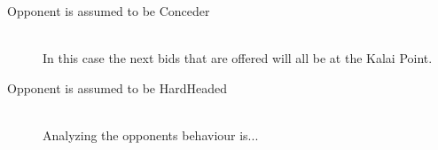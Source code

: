 \begin{description}
  \item[Opponent is assumed to be Conceder] \hfill \\
  In this case the next bids that are offered will all be at the Kalai Point.

  \item[Opponent is assumed to be HardHeaded] \hfill \\
  Analyzing the opponents behaviour is...
\end{description}

